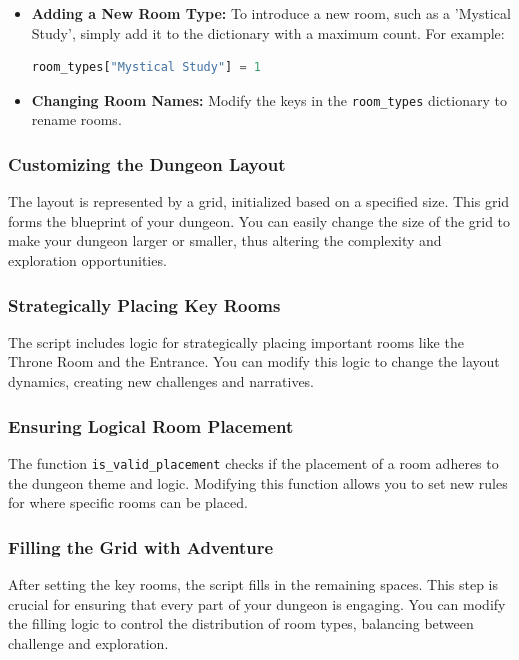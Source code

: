 \documentclass[10pt,twocolumn]{article}
\begin{document}
\begin{itemize}
    \item \textbf{Adding a New Room Type:} To introduce a new room, such as a 'Mystical Study', simply add it to the dictionary with a maximum count. For example:
    \begin{lstlisting}[language=Python]
    room_types["Mystical Study"] = 1
    \end{lstlisting}

    \item \textbf{Changing Room Names:} Modify the keys in the \texttt{room\_types} dictionary to rename rooms.
\end{itemize}

\subsubsection{Customizing the Dungeon Layout}
The layout is represented by a grid, initialized based on a specified size. This grid forms the blueprint of your dungeon. You can easily change the size of the grid to make your dungeon larger or smaller, thus altering the complexity and exploration opportunities.

\subsubsection{Strategically Placing Key Rooms}
The script includes logic for strategically placing important rooms like the Throne Room and the Entrance. You can modify this logic to change the layout dynamics, creating new challenges and narratives.

\subsubsection{Ensuring Logical Room Placement}
The function \texttt{is\_valid\_placement} checks if the placement of a room adheres to the dungeon theme and logic. Modifying this function allows you to set new rules for where specific rooms can be placed.

\subsubsection{Filling the Grid with Adventure}
After setting the key rooms, the script fills in the remaining spaces. This step is crucial for ensuring that every part of your dungeon is engaging. You can modify the filling logic to control the distribution of room types, balancing between challenge and exploration.
\end{document}
